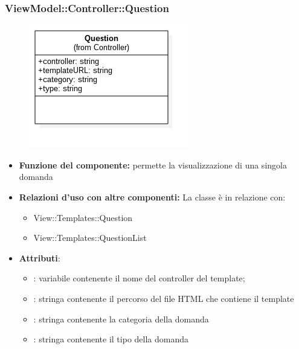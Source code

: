 \newpage

\subsubsection{ViewModel::Controller::Question}
\begin{figure}[h!]
\begin{center}
	\includegraphics[scale=0.6]{../images/ViewModel/Controller/Question.png}
\end{center}
\end{figure}
\begin{itemize}
\item\textbf{Funzione del componente:} permette la visualizzazione di una singola domanda
				\item\textbf{Relazioni d'uso con altre componenti:} 
La classe è in relazione con:
\begin{itemize}
		\item View::Templates::Question
		\item View::Templates::QuestionList
	\end{itemize}
\item\textbf{Attributi}:
	\begin{itemize}
		\item{}: variabile contenente il nome del controller del template;\\

		\item{}: stringa contenente il percorso del file HTML che contiene il template\\
		\item{}: stringa contenente la categoria della domanda
 		\item{}: stringa contenente il tipo della domanda
	\end{itemize}
\end{itemize}
\newpage

